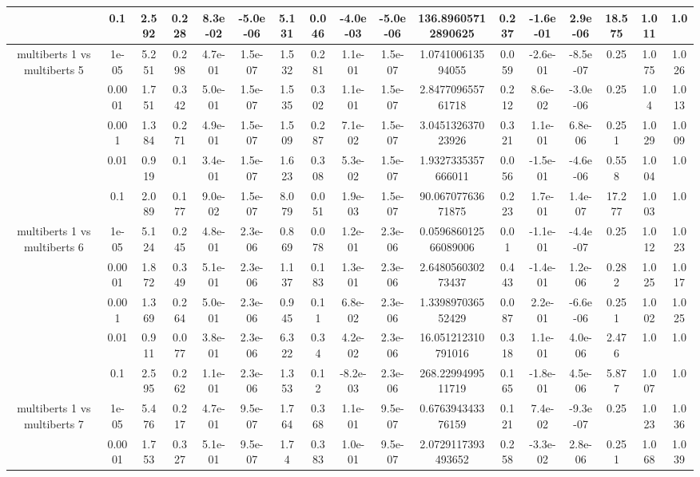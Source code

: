 \begin{tabular}{|c|c|c|c|c|c|c|c|c|c|c|c|c|c|c|c|c|}
 & 0.1 & 2.592 & 0.228 & 8.3e-02 & -5.0e-06 & 5.131 & 0.046 & -4.0e-03 & -5.0e-06 & 136.89605712890625 & 0.237 & -1.6e-01 & 2.9e-06 & 18.575 & 1.011 & 1.0 \\
\hline
\multirow{5}{*}{multiberts 1 vs multiberts 5} & 1e-05 & 5.251 & 0.298 & 4.7e-01 & 1.5e-07 & 1.532 & 0.281 & 1.1e-01 & 1.5e-07 & 1.074100613594055 & 0.059 & -2.6e-01 & -8.5e-07 & 0.25 & 1.075 & 1.026 \\
 & 0.0001 & 1.751 & 0.342 & 5.0e-01 & 1.5e-07 & 1.535 & 0.302 & 1.1e-01 & 1.5e-07 & 2.847709655761718 & 0.212 & 8.6e-02 & -3.0e-06 & 0.25 & 1.04 & 1.013 \\
 & 0.001 & 1.384 & 0.271 & 4.9e-01 & 1.5e-07 & 1.509 & 0.287 & 7.1e-02 & 1.5e-07 & 3.045132637023926 & 0.321 & 1.1e-01 & 6.8e-06 & 0.251 & 1.029 & 1.009 \\
 & 0.01 & 0.919 & 0.1 & 3.4e-01 & 1.5e-07 & 1.623 & 0.308 & 5.3e-02 & 1.5e-07 & 1.9327335357666011 & 0.056 & -1.5e-01 & -4.6e-06 & 0.558 & 1.004 & 1.0 \\
 & 0.1 & 2.089 & 0.177 & 9.0e-02 & 1.5e-07 & 8.079 & 0.051 & 1.9e-03 & 1.5e-07 & 90.06707763671875 & 0.223 & 1.7e-01 & 1.4e-07 & 17.277 & 1.003 & 1.0 \\
\hline
\multirow{5}{*}{multiberts 1 vs multiberts 6} & 1e-05 & 5.124 & 0.245 & 4.8e-01 & 2.3e-06 & 0.869 & 0.078 & 1.2e-01 & 2.3e-06 & 0.059686012566089006 & 0.01 & -1.1e-01 & -4.4e-07 & 0.25 & 1.012 & 1.023 \\
 & 0.0001 & 1.872 & 0.349 & 5.1e-01 & 2.3e-06 & 1.137 & 0.183 & 1.3e-01 & 2.3e-06 & 2.648056030273437 & 0.443 & -1.4e-01 & 1.2e-06 & 0.282 & 1.025 & 1.017 \\
 & 0.001 & 1.369 & 0.264 & 5.0e-01 & 2.3e-06 & 0.945 & 0.11 & 6.8e-02 & 2.3e-06 & 1.339897036552429 & 0.087 & 2.2e-01 & -6.6e-06 & 0.251 & 1.002 & 1.025 \\
 & 0.01 & 0.911 & 0.077 & 3.8e-01 & 2.3e-06 & 6.322 & 0.34 & 4.2e-02 & 2.3e-06 & 16.051212310791016 & 0.318 & 1.1e-01 & 4.0e-06 & 2.476 & 1.0 & 1.0 \\
 & 0.1 & 2.595 & 0.262 & 1.1e-01 & 2.3e-06 & 1.353 & 0.12 & -8.2e-03 & 2.3e-06 & 268.2299499511719 & 0.165 & -1.8e-01 & 4.5e-06 & 5.877 & 1.007 & 1.0 \\
\hline
\multirow{5}{*}{multiberts 1 vs multiberts 7} & 1e-05 & 5.476 & 0.217 & 4.7e-01 & 9.5e-07 & 1.764 & 0.368 & 1.1e-01 & 9.5e-07 & 0.676394343376159 & 0.121 & 7.4e-02 & -9.3e-07 & 0.25 & 1.023 & 1.036 \\
 & 0.0001 & 1.753 & 0.327 & 5.1e-01 & 9.5e-07 & 1.74 & 0.383 & 1.0e-01 & 9.5e-07 & 2.0729117393493652 & 0.258 & -3.3e-02 & 2.8e-06 & 0.251 & 1.068 & 1.039 \\

\end{tabular}
